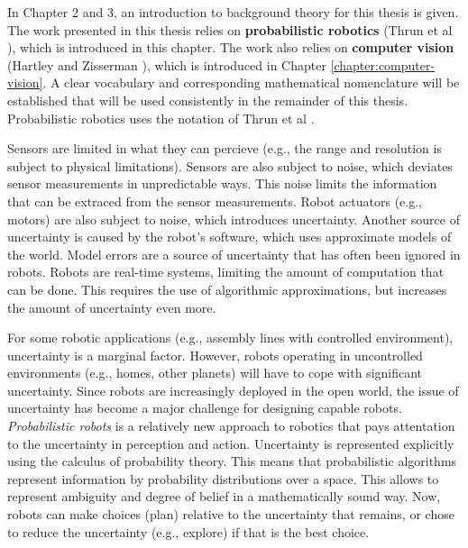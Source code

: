 In Chapter 2 and 3, an introduction to background theory for this thesis is given.
The work presented in this thesis relies on \textbf{probabilistic robotics} (Thrun et al \cite{fox2005probabilistic}), which is introduced in this chapter.
The work also relies on \textbf{computer vision} (Hartley and Zisserman \cite{Hartley2004}), which is introduced in Chapter \ref{chapter:computer-vision}.
A clear vocabulary and corresponding mathematical nomenclature will be established that will be used consistently in the remainder of this thesis.
Probabilistic robotics uses the notation of Thrun et al \cite{fox2005probabilistic}.

Sensors are limited in what they can percieve (e.g., the range and resolution is subject to physical limitations).
Sensors are also subject to noise, which deviates sensor measurements in unpredictable ways.
This noise limits the information that can be extraced from the sensor measurements.
Robot actuators (e.g., motors) are also subject to noise, which introduces uncertainty.
Another source of uncertainty is caused by the robot's software, which uses approximate models of the world.
Model errors are a source of uncertainty that has often been ignored in robots.
Robots are real-time systems, limiting the amount of computation that can be done.
This requires the use of algorithmic approximations, but increases the amount of uncertainty even more.

For some robotic applications (e.g., assembly lines with controlled environment), uncertainty is a marginal factor.
However, robots operating in uncontrolled environments (e.g., homes, other planets) will have to cope with significant uncertainty.
Since robots are increasingly deployed in the open world, the issue of uncertainty has become a major challenge for designing capable robots.
\textit{Probabilistic robots} is a relatively new approach to robotics that pays attentation to the uncertainty in perception and action.
Uncertainty is represented explicitly using the calculus of probability theory.
This means that probabilistic algorithms represent information by probability distributions over a space.
This allows to represent ambiguity and degree of belief in a mathematically sound way.
Now, robots can make choices (plan) relative to the uncertainty that remains, or chose to reduce the uncertainty (e.g., explore) if that is the best choice.

